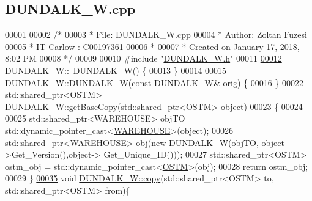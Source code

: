 \hypertarget{_d_u_n_d_a_l_k___w_8cpp_source}{}\subsection{D\+U\+N\+D\+A\+L\+K\+\_\+\+W.\+cpp}

\begin{DoxyCode}
00001 
00002 \textcolor{comment}{/* }
00003 \textcolor{comment}{ * File:   DUNDALK\_W.cpp}
00004 \textcolor{comment}{ * Author: Zoltan Fuzesi}
00005 \textcolor{comment}{ * IT Carlow : C00197361}
00006 \textcolor{comment}{ *}
00007 \textcolor{comment}{ * Created on January 17, 2018, 8:02 PM}
00008 \textcolor{comment}{ */}
00009 
00010 \textcolor{preprocessor}{#include "\hyperlink{_d_u_n_d_a_l_k___w_8h}{DUNDALK\_W.h}"}
00011 
\hypertarget{_d_u_n_d_a_l_k___w_8cpp_source.tex_l00012}{}\hyperlink{class_d_u_n_d_a_l_k___w_a91d26f413bf5bc2d089b77036f7fbfa9_a91d26f413bf5bc2d089b77036f7fbfa9}{00012} \hyperlink{class_d_u_n_d_a_l_k___w_a91d26f413bf5bc2d089b77036f7fbfa9_a91d26f413bf5bc2d089b77036f7fbfa9}{DUNDALK\_W::~DUNDALK\_W}() \{
00013 \}
00014 
\hypertarget{_d_u_n_d_a_l_k___w_8cpp_source.tex_l00015}{}\hyperlink{class_d_u_n_d_a_l_k___w_a0ee6950b4b6cb12b73595e805be8ba64_a0ee6950b4b6cb12b73595e805be8ba64}{00015} \hyperlink{class_d_u_n_d_a_l_k___w_ad459a77b4f3e0aaebb3d178eb014a77f_ad459a77b4f3e0aaebb3d178eb014a77f}{DUNDALK\_W::DUNDALK\_W}(\textcolor{keyword}{const} \hyperlink{class_d_u_n_d_a_l_k___w}{DUNDALK\_W}& orig) \{
00016 \}
\hypertarget{_d_u_n_d_a_l_k___w_8cpp_source.tex_l00022}{}\hyperlink{class_d_u_n_d_a_l_k___w_a06cbcac20829906b710962967795d4e6_a06cbcac20829906b710962967795d4e6}{00022} std::shared\_ptr<OSTM> \hyperlink{class_d_u_n_d_a_l_k___w_a06cbcac20829906b710962967795d4e6_a06cbcac20829906b710962967795d4e6}{DUNDALK\_W::getBaseCopy}(std::shared\_ptr<OSTM> \textcolor{keywordtype}{object})
00023 \{
00024 
00025     std::shared\_ptr<WAREHOUSE> objTO = std::dynamic\_pointer\_cast<\hyperlink{class_w_a_r_e_h_o_u_s_e}{WAREHOUSE}>(object);
00026     std::shared\_ptr<WAREHOUSE> obj(\textcolor{keyword}{new} \hyperlink{class_d_u_n_d_a_l_k___w_ad459a77b4f3e0aaebb3d178eb014a77f_ad459a77b4f3e0aaebb3d178eb014a77f}{DUNDALK\_W}(objTO, object->Get\_Version(),\textcolor{keywordtype}{object}->
      Get\_Unique\_ID()));
00027     std::shared\_ptr<OSTM> ostm\_obj = std::dynamic\_pointer\_cast<\hyperlink{class_o_s_t_m}{OSTM}>(obj);
00028     \textcolor{keywordflow}{return} ostm\_obj;
00029 \}
\hypertarget{_d_u_n_d_a_l_k___w_8cpp_source.tex_l00035}{}\hyperlink{class_d_u_n_d_a_l_k___w_a850117e656ee2961317f758e70e5d143_a850117e656ee2961317f758e70e5d143}{00035} \textcolor{keywordtype}{void} \hyperlink{class_d_u_n_d_a_l_k___w_a850117e656ee2961317f758e70e5d143_a850117e656ee2961317f758e70e5d143}{DUNDALK\_W::copy}(std::shared\_ptr<OSTM> to, std::shared\_ptr<OSTM> from)\{

\end{DoxyCode}
